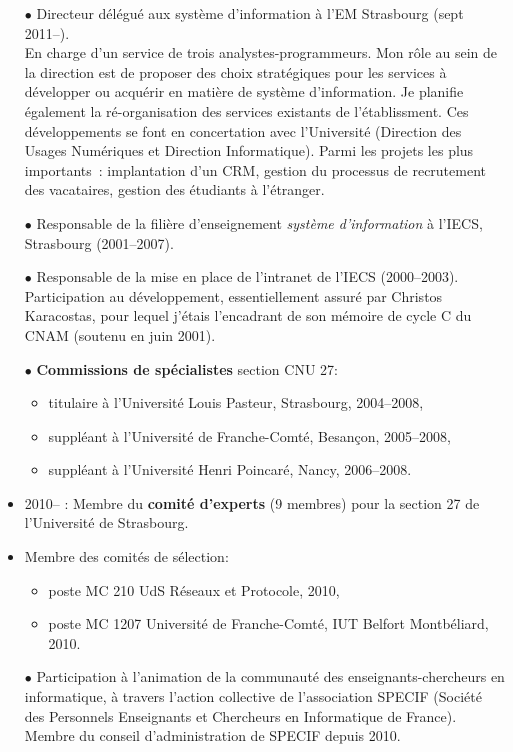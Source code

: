 \documentclass[11pt]{article}
\begin{document}
\begin{itemize}
\item[$\bullet$] Directeur délégué aux système d'information à l'EM Strasbourg (sept 2011--).\\
En charge d'un service de trois analystes-programmeurs. Mon rôle au sein de la direction
est de proposer des choix stratégiques pour les services à développer ou acquérir en matière 
de système d'information. Je planifie également la ré-organisation des services existants de 
l'établissment. Ces développements se font en concertation avec l'Université (Direction des 
Usages Numériques et Direction Informatique). Parmi les projets les plus importants~: 
implantation d'un CRM, gestion du processus de recrutement des vacataires, gestion des
étudiants à l'étranger.\\
		

\item[$\bullet$] Responsable de la filière d'enseignement \emph{système d'information} à l'IECS, Strasbourg (2001--2007).\\

\item[$\bullet$] 
Responsable de la mise en place de l'intranet de l'IECS (2000--2003). 
Participation au développement, essentiellement assuré par Christos Karacostas,
pour lequel j'étais l'encadrant de son mémoire de cycle C du CNAM (soutenu en juin 2001).\\

\item[$\bullet$] \textbf{Commissions de spécialistes} section CNU 27:
	\begin{itemize}
		\item titulaire à l'Université Louis Pasteur, Strasbourg, 2004--2008,
		\item suppléant à l'Université de Franche-Comté, Besançon, 2005--2008,
		\item suppléant à l'Université Henri Poincaré, Nancy, 2006--2008.\\
	\end{itemize}
	\item 2010-- : Membre du \textbf{comité d'experts} (9 membres) pour la section 
		27 de l'Université de Strasbourg.
	\item Membre des comités de sélection:
	\begin{itemize}
		\item poste MC 210 UdS Réseaux et Protocole, 2010,
		\item poste MC 1207 Université de Franche-Comté, IUT Belfort Montbéliard, 2010.\\
	\end{itemize}


\item[$\bullet$] 
Participation à l'animation de la communauté des enseignants-chercheurs en informatique, à travers 
l'action collective de l'association SPECIF (Société des Personnels Enseignants et Chercheurs 
en Informatique de France). Membre du conseil d'administration de SPECIF depuis 2010.
\end{itemize}
\vspace{1cm}
\end{document}
